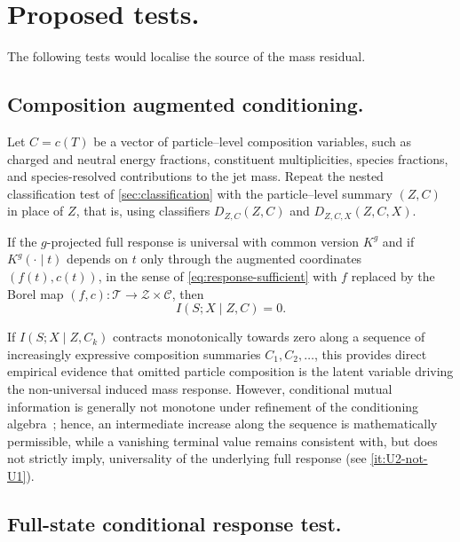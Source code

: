 \documentclass[12pt]{article}
\newcommand{\1}{\mathbbm{1}}
\renewcommand{\[}{\begin{equation}}
\renewcommand{\]}{\end{equation}}
\begin{document}
\section{Proposed tests.}
\label{sec:tests}

    The following tests would localise the source of the mass residual.

    \subsection{Composition augmented conditioning.}

    Let \(C = c(T)\) be a vector of particle--level composition variables, such as charged and neutral energy fractions, constituent multiplicities, species fractions, and species-resolved contributions to the jet mass.
    Repeat the nested classification test of \cref{sec:classification} with the particle--level summary \((Z,C)\) in place of \(Z\), that is, using classifiers \(D_{Z,C}(Z,C)\) and \(D_{Z,C,X}(Z,C,X)\).

\begin{corollary}
    \label{cor:composition}
        If the \(g\)-projected full response is universal with common version \(K^g\) and if \(K^g(\cdot \mid t)\) depends on \(t\) only through the augmented coordinates \((f(t), c(t))\), in the sense of \cref{eq:response-sufficient} with \(f\) replaced by the Borel map \((f,c) : \mathcal{T} \to \mathcal{Z} \times \mathcal{C}\), then
        \[
            I(S; X \mid Z, C) = 0.
        \]
    \end{corollary}

    If \(I(S; X \mid Z, C_k)\) contracts monotonically towards zero along a sequence of increasingly expressive composition summaries \(C_1, C_2, \ldots\), this provides direct empirical evidence that omitted particle composition is the latent variable driving the non-universal induced mass response.
    However, conditional mutual information is generally not monotone under refinement of the conditioning algebra~\cite{CoverThomas:2006}; hence, an intermediate increase along the sequence is mathematically permissible, while a vanishing terminal value remains consistent with, but does not strictly imply, universality of the underlying full response (see \cref{it:U2-not-U1}).

    \subsection{Full-state conditional response test.}
\end{document}
